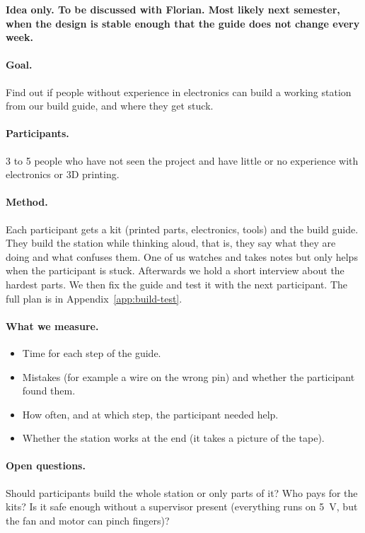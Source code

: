 \begin{planned}
\textbf{Idea only. To be discussed with Florian. Most likely next semester, when the design is
stable enough that the guide does not change every week.}

\paragraph{Goal.} Find out if people without experience in electronics can build a working
station from our build guide, and where they get stuck.

\paragraph{Participants.} 3 to 5 people who have not seen the project and have little or no
experience with electronics or 3D printing.

\paragraph{Method.} Each participant gets a kit (printed parts, electronics, tools) and the build
guide. They build the station while thinking aloud, that is, they say what they are doing and
what confuses them. One of us watches and takes notes but only helps when the participant is
stuck. Afterwards we hold a short interview about the hardest parts. We then fix the guide and
test it with the next participant. The full plan is in Appendix~\ref{app:build-test}.

\paragraph{What we measure.}
\begin{itemize}
  \item Time for each step of the guide.
  \item Mistakes (for example a wire on the wrong pin) and whether the participant found them.
  \item How often, and at which step, the participant needed help.
  \item Whether the station works at the end (it takes a picture of the tape).
\end{itemize}

\paragraph{Open questions.} Should participants build the whole station or only parts of it?
Who pays for the kits? Is it safe enough without a supervisor present (everything runs on 5~V,
but the fan and motor can pinch fingers)?
\end{planned}

